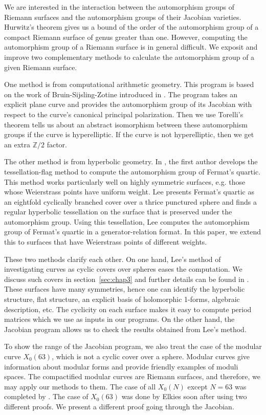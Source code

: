 \documentclass[12pt,reqno]{amsart}
\newcommand{\Z}{\mathbb{Z}}
\theoremstyle{definition}
\theoremstyle{remark}
\begin{document}
We are interested in the interaction between the automorphism groups of Riemann surfaces and the automorphism groups of their Jacobian varieties. Hurwitz's theorem gives us a bound of the order of the automorphism group of a compact Riemann surface of genus greater than one. However, computing the automorphism group of a Riemann surface is in general difficult. We exposit and improve two complementary methods to calculate the automorphism group of a given Riemann surface.

One method is from computational arithmetic geometry. This program is based on the work of Bruin-Sijsling-Zotine introduced in \cite{jeroen}. The program takes an explicit plane curve and provides the automorphism group of its Jacobian with respect to the curve's canonical principal polarization. Then we use Torelli's theorem tells us about an abstract isomorphism between these automorphism groups if the curve is hyperelliptic. If the curve is not hyperelliptic, then we get an extra $\Z/2$ factor. %

The other method is from hyperbolic geometry. In \cite{dami}, the first author develops the tessellation-flag method to compute the automorphism group of Fermat's quartic. This method works particularly well on highly symmetric surfaces, e.g. those whose Weierstrass points have uniform weight. Lee presents Fermat's quartic as an eightfold cyclically branched cover over a thrice punctured sphere and finds a regular hyperbolic tessellation on the surface that is preserved under the automorphism group. Using this tessellation, Lee computes the automorphism group of Fermat's quartic in a generator-relation format. In this paper, we extend this to surfaces that have Weierstrass points of different weights. 

These two methods clarify each other. On one hand, Lee's method of investigating curves as cyclic covers over spheres eases the computation. We discuss such covers in section~\ref{sec:chap3} and further details can be found in \cite{dthesis}. These surfaces have many symmetries, hence one can identify the hyperbolic structure, flat structure, an explicit basis of holomorphic 1-forms, algebraic description, etc. The cyclicity on each surface makes it easy to compute period matrices which we use as inputs in our programs. On the other hand, the Jacobian program allows us to check the results obtained from Lee's method. 

To show the range of the Jacobian program, we also treat the case of the modular curve $X_0(63)$, which is not a cyclic cover over a sphere. Modular curves give information about modular forms and provide friendly examples of moduli spaces. The compactified modular curves are Riemann surfaces, and therefore, we may apply our methods to them. The case of all $X_0(N)$ except $N = 63$ was completed by \cite{km}. The case of $X_0(63)$ was done by Elkies soon after using two different proofs. We present a different proof going through the Jacobian.
\end{document}
